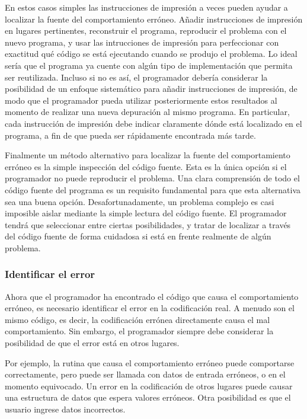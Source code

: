 \documentclass[12pt,legalpaper]{report}
\begin{document}
En estos casos simples las instrucciones de impresión a veces pueden ayudar a localizar la fuente del comportamiento erróneo. Añadir instrucciones de impresión en lugares pertinentes, reconstruir el programa, reproducir el problema con el nuevo programa, y usar las intrucciones de impresión para perfeccionar con exactitud qué código se está ejecutando cuando se produjo el problema.  Lo ideal sería que el programa ya cuente con algún tipo de implementación que permita ser reutilizada. Incluso si no es así, el programador debería considerar la posibilidad de un enfoque sistemático para añadir instrucciones de impresión, de modo que el programador pueda utilizar posteriormente estos resultados al momento de realizar una nueva depuración al mismo programa. En particular, cada instrucción de impresión debe indicar claramente dónde está localizado en el programa, a fin de que pueda ser rápidamente encontrada más tarde.

Finalmente un método alternativo para localizar la fuente del comportamiento erróneo es la simple inspección del código fuente. Esta es la única opción si el programador no puede reproducir el problema. Una clara comprensión de todo el código fuente del programa es un requisito fundamental para que esta alternativa sea una buena opción. Desafortunadamente, un problema complejo es casi imposible aislar mediante la simple lectura del código fuente.  El programador tendrá que seleccionar entre ciertas posibilidades, y tratar de localizar a través del código fuente de forma cuidadosa si está en frente realmente de algún problema.


\subsubsection{Identificar el error}

Ahora que el programador ha encontrado el código que causa el comportamiento erróneo, es necesario identificar el error en la codificación real. A menudo son el mismo código, es decir, la codificación errónea directamente causa el mal comportamiento. Sin embargo, el programador siempre debe considerar la posibilidad de que el error está en otros lugares.

Por ejemplo, la rutina que causa el comportamiento erróneo puede comportarse correctamente, pero puede ser llamada con datos de entrada erróneos, o en el momento equivocado. Un error en la codificación de otros lugares puede causar una estructura de datos que espera valores erróneos. Otra posibilidad es que el usuario ingrese datos incorrectos.
\end{document}
